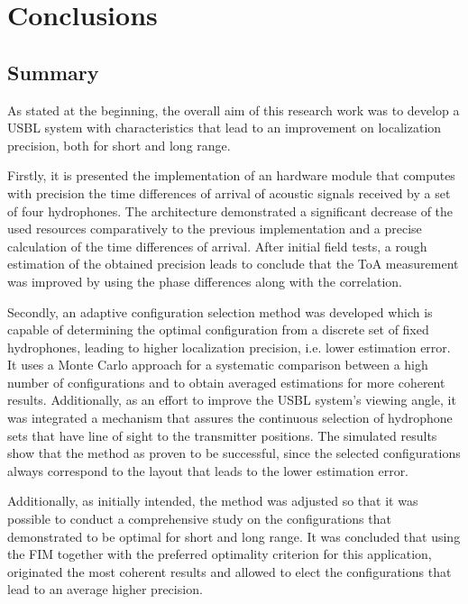 \chapter{Conclusions}  \label{chap:conclusion}

\section{Summary}

As stated at the beginning, the overall aim of this research work was to develop a USBL system with characteristics that lead to an improvement on localization precision, both for short and long range.

Firstly, it is presented the implementation of an hardware module that computes with precision the time differences of arrival of acoustic signals received by a set of four hydrophones. The architecture demonstrated a significant decrease of the used resources comparatively to the previous implementation and a precise calculation of the time differences of arrival. After initial field tests, a rough estimation of the obtained precision leads to conclude that the ToA measurement was improved by using the phase differences along with the correlation.

Secondly, an adaptive configuration selection method was developed which is capable of determining the optimal configuration from a discrete set of fixed hydrophones, leading to higher localization precision, i.e. lower estimation error. It uses a Monte Carlo approach for a systematic comparison between a high number of configurations and to obtain averaged estimations for more coherent results. Additionally, as an effort to improve the USBL system's viewing angle, it was integrated a mechanism that assures the continuous selection of hydrophone sets that have line of sight to the transmitter positions. The simulated results show that the method as proven to be successful, since the selected configurations always correspond to the layout that leads to the lower estimation error.

Additionally, as initially intended, the method was adjusted so that it was possible to conduct a comprehensive study on the configurations that demonstrated to be optimal for short and long range. It was concluded that using the FIM together with the preferred optimality criterion for this application, originated the most coherent results and allowed to elect the configurations that lead to an average higher precision.

